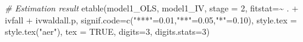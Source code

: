 \documentclass[
]{article}
\newenvironment{Shaded}{\begin{snugshade}}{\end{snugshade}}
\newcommand{\AttributeTok}[1]{\textcolor[rgb]{0.77,0.63,0.00}{#1}}
\newcommand{\CommentTok}[1]{\textcolor[rgb]{0.56,0.35,0.01}{\textit{#1}}}
\newcommand{\ConstantTok}[1]{\textcolor[rgb]{0.00,0.00,0.00}{#1}}
\newcommand{\DecValTok}[1]{\textcolor[rgb]{0.00,0.00,0.81}{#1}}
\newcommand{\FloatTok}[1]{\textcolor[rgb]{0.00,0.00,0.81}{#1}}
\newcommand{\FunctionTok}[1]{\textcolor[rgb]{0.00,0.00,0.00}{#1}}
\newcommand{\NormalTok}[1]{#1}
\newcommand{\OtherTok}[1]{\textcolor[rgb]{0.56,0.35,0.01}{#1}}
\newcommand{\SpecialCharTok}[1]{\textcolor[rgb]{0.00,0.00,0.00}{#1}}
\newcommand{\StringTok}[1]{\textcolor[rgb]{0.31,0.60,0.02}{#1}}
\begin{document}
\begin{Shaded}
\begin{Highlighting}[]
\CommentTok{\# Estimation result}
\FunctionTok{etable}\NormalTok{(model1\_OLS, model1\_IV, }\AttributeTok{stage =} \DecValTok{2}\NormalTok{, }\AttributeTok{fitstat=}\SpecialCharTok{\textasciitilde{}}\NormalTok{ . }\SpecialCharTok{+}\NormalTok{ ivfall }\SpecialCharTok{+}\NormalTok{ ivwaldall.p,}
       \AttributeTok{signif.code=}\FunctionTok{c}\NormalTok{(}\StringTok{"***"}\OtherTok{=}\FloatTok{0.01}\NormalTok{,}\StringTok{"**"}\OtherTok{=}\FloatTok{0.05}\NormalTok{,}\StringTok{"*"}\OtherTok{=}\FloatTok{0.10}\NormalTok{), }
       \AttributeTok{style.tex =} \FunctionTok{style.tex}\NormalTok{(}\StringTok{"aer"}\NormalTok{),  }\AttributeTok{tex =} \ConstantTok{TRUE}\NormalTok{,}
       \AttributeTok{digits=}\DecValTok{3}\NormalTok{, }\AttributeTok{digits.stats=}\DecValTok{3}\NormalTok{)}
\end{Highlighting}
\end{Shaded}
\end{document}
